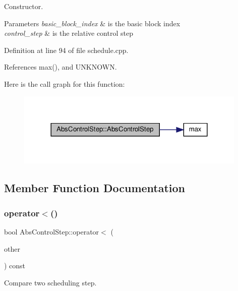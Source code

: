 Constructor. 


\begin{DoxyParams}{Parameters}
{\em basic\+\_\+block\+\_\+index} & is the basic block index \\
\hline
{\em control\+\_\+step} & is the relative control step \\
\hline
\end{DoxyParams}


Definition at line 94 of file schedule.\+cpp.



References max(), and U\+N\+K\+N\+O\+WN.

Here is the call graph for this function\+:
\nopagebreak
\begin{figure}[H]
\begin{center}
\leavevmode
\includegraphics[width=312pt]{dd/d8e/structAbsControlStep_a2559549c06bfc138bd9829b7874770b4_cgraph}
\end{center}
\end{figure}


\subsection{Member Function Documentation}
\mbox{\label{structAbsControlStep_a92a593be50a54d4dbcc844972add11e3}} 
\subsubsection{\texorpdfstring{operator$<$()}{operator<()}}
{\footnotesize\ttfamily bool Abs\+Control\+Step\+::operator$<$ (\begin{DoxyParamCaption}\item[{const \hyperlink{structAbsControlStep}{Abs\+Control\+Step} \&}]{other }\end{DoxyParamCaption}) const}



Compare two scheduling step. 


